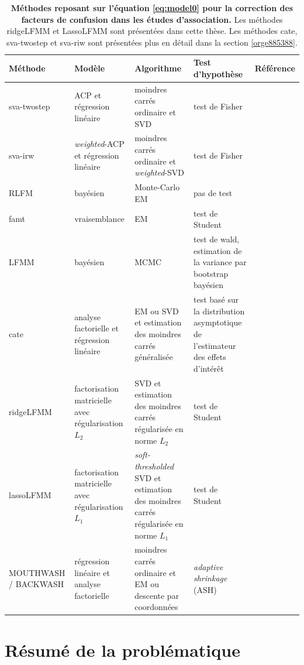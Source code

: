 \documentclass[12pt,a4paper,twoside]{ugathesis}
\begin{document}
\begin{table}
\caption{\label{tab:orgd34e726}
\textbf{Méthodes reposant sur l'équation \ref{eq:model0} pour la correction des facteurs de confusion dans les études d'association.} Les méthodes ridgeLFMM et LassoLFMM sont présentées dans cette thèse. Les méthodes cate, sva-twostep et sva-riw sont présentées plus en détail dans la section \ref{orge885388}.}
\centering
\begin{tabular}{p{3cm}|p{4.2cm}p{4cm}p{5cm}|p{4cm}}
\hline
Méthode & Modèle & Algorithme & Test d'hypothèse & Référence\\
\hline
sva-twostep & ACP et régression linéaire & moindres carrés ordinaire et SVD & test de Fisher & \citet{article_Leek_Storey_2007}\\
sva-irw & \emph{weighted}-ACP et régression linéaire & moindres carrés ordinaire et \emph{weighted}-SVD & test de Fisher & \citet{article_Leek_Storey_2008}\\
RLFM & bayésien & Monte-Carlo EM & pas de test & \citet{agarwal09_regres}\\
famt & vraisemblance & EM & test de Student & \citet{friguet09_factor_model_approac_to_multip}\\
LFMM & bayésien & MCMC & test de wald, estimation de la variance par bootstrap bayésien & \citet{Frichot_2013}\\
cate & analyse factorielle et régression linéaire & EM ou SVD et estimation des moindres carrés généralisée & test basé sur la distribution asymptotique de l'estimateur des effets d'intérêt & \citet{wang2015confounder}\\
ridgeLFMM & factorisation matricielle avec régularisation \(L_{2}\) & SVD et estimation des moindres carrés régularisée en norme \(L_{2}\) & test de Student & \\
lassoLFMM & factorisation matricielle avec régularisation \(L_{1}\) & \emph{soft-thresholded} SVD et estimation des moindres carrés régularisée en norme \(L_{1}\) & test de Student & \\
MOUTHWASH / BACKWASH & régression linéaire et analyse factorielle & moindres carrés ordinaire et EM ou descente par coordonnées & \emph{adaptive shrinkage} (ASH) \citep{stephens16_false_discov_rates} & \citet{gerard2017empirical}\\
\end{tabular}
\end{table}

\section{Résumé de la problématique}
\label{sec:org1be5706}
\end{document}

